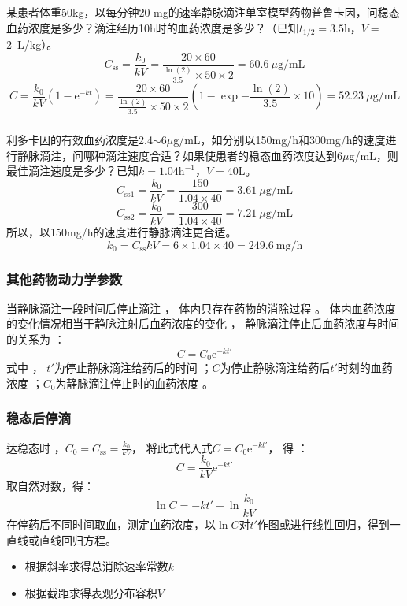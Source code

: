 \documentclass[dvipsnames, svgnames, x11names]{beamer}
\begin{document}
\begin{frame}[t]
    \frametitle{}
    \begin{example}
        某患者体重50kg，以每分钟20 mg的速率静脉滴注单室模型药物普鲁卡因，问稳态血药浓度是多少？滴注经历10h时的血药浓度是多少？（已知$t_{1/2}=3.5 \mathrm{h}$，$V=$\SI{2}{L/kg}）。
        \tcblower
        \pause
        \[
            C_\mathrm{ss}=\frac{k_{0}}{kV} = \frac{20\times 60}{\frac{\ln(2)}{3.5}\times 50\times 2} = 60.6 \ \mu\mathrm{ g/mL}
        \]
        \[
            C=\frac{k_{0}}{kV}(1-\mathrm{e}^{-kt}) = \frac{20\times 60}{\frac{\ln(2)}{3.5}\times 50\times 2}(1-\exp{-\frac{\ln(2)}{3.5}\times 10}) = 52.23 \ \mu\mathrm{g/mL}
        \]
    \end{example}
\end{frame}


\begin{frame}[t]
    \frametitle{}
    \begin{example}
        利多卡因的有效血药浓度是2.4$\sim$6$\mu$g/mL，如分别以150mg/h和300mg/h的速度进行静脉滴注，问哪种滴注速度合适？如果使患者的稳态血药浓度达到6$\mu$g/mL，则最佳滴注速度是多少？已知$k=1.04 \mathrm{h}^{-1}$，$V=40$L。
        \tcblower
        \pause
        \[
            C_\mathrm{ss1}=\frac{k_{0}}{kV} = \frac{150}{1.04\times40} = 3.61 \ \mu\mathrm{ g/mL}
        \]
        \[
            C_\mathrm{ss2}=\frac{k_{0}}{kV} = \frac{300}{1.04\times40} = 7.21 \ \mu\mathrm{ g/mL}
        \]
        所以，以150mg/h的速度进行静脉滴注更合适。
        \[
            k_{0}=C_\mathrm{ss}{kV} = 6\times 1.04\times40 = 249.6 \ \mathrm{ mg/h}
        \]
    \end{example}
\end{frame}


\begin{frame}
    \frametitle{其他药物动力学参数}
    当静脉滴注一段时间后停止滴注 ， 体内只存在药物的消除过程 。 体内血药浓度的变化情况相当于静脉注射后血药浓度的变化 ， 静脉滴注停止后血药浓度与时间的关系为 ：
    \[
        C=C_0\mathrm{e}^{-kt'}
    \]
    式中 ， $t'$为停止静脉滴注给药后的时间 ；$C$为停止静脉滴注给药后$t'$时刻的血药浓度 ；$C_0$为静脉滴注停止时的血药浓度 。
\end{frame}


\begin{frame}
    \frametitle{稳态后停滴}
    达稳态时 ，$C_0=C_\mathrm{ss}=\frac{k_{0}}{kV}$， 将此式代入式$C=C_0\mathrm{e}^{-kt'}$， 得 ：
    \[
        C=\frac{k_{0}}{kV}\mathrm{e}^{-kt'}
    \]
    取自然对数，得：
    \[
        \ln C=-kt'+\ln\frac{k_{0}}{kV}
    \]
    在停药后不同时间取血，测定血药浓度，以$\ln C$对$t'$作图或进行线性回归，得到一直线或直线回归方程。
    \begin{itemize}
      \item 根据斜率求得总消除速率常数$k$
      \item 根据截距求得表观分布容积$V$
    \end{itemize}
\end{frame}
\end{document}
